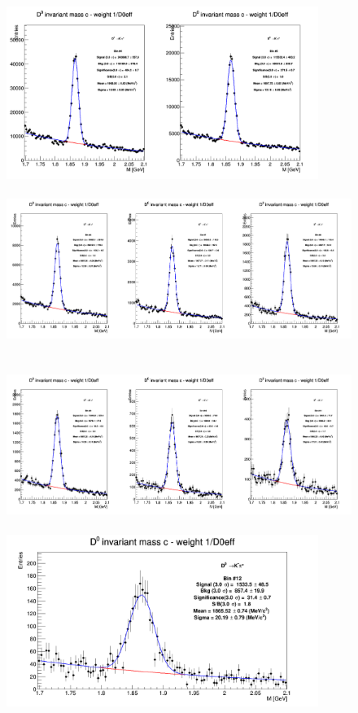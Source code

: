 \begin{figure}[!htp]
\centering

{\includegraphics[width=1\linewidth, height=5.6cm]{figures/Dzero/InvMassDistributions_Dzero_Bins4to5.png}}
{\includegraphics[width=1\linewidth, height=5.6cm]{figures/Dzero/InvMassDistributions_Dzero_Bins6to8.png}}
{\includegraphics[width=1\linewidth, height=5.6cm]{figures/Dzero/InvMassDistributions_Dzero_Bins9to11.png}}
{\includegraphics[width=0.6\linewidth, height=5.6cm]{figures/Dzero/InvMassDistributions_Dzero_Bins12to12.png}}


\end{figure}
